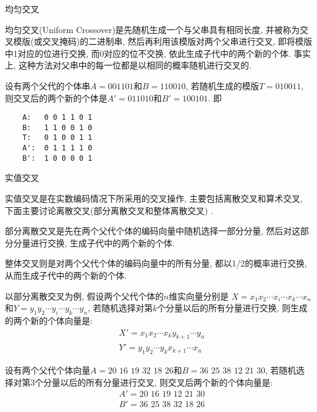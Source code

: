 { 均匀交叉

均匀交叉(Uniform Crossover)是先随机生成一个与父串具有相同长度, 并被称为交叉模版(或交叉掩码)的二进制串, 然后再利用该模版对两个父串进行交叉, 即将模版中1对应的位进行交换, 而0对应的位不交换, 依此生成子代中的两个新的个体.
事实上, 这种方法对父串中的每一位都是以相同的概率随机进行交叉的.

\begin{example}
设有两个父代的个体串$A=001101$和$B=110010$, 若随机生成的模版$T=010011$, 则交叉后的两个新的个体是$A'=011010$和$B'=100101$. 即
\begin{center}
\begin{Verbatim}
    A:   0 0 1 1 0 1
    B:   1 1 0 0 1 0
    T:   0 1 0 0 1 1
    A':  0 1 1 1 1 0
    B':  1 0 0 0 0 1
\end{Verbatim}
\end{center}

     实值交叉
\end{example}

实值交叉是在实数编码情况下所采用的交叉操作, 主要包括离散交叉和算术交叉, 下面主要讨论离散交叉(部分离散交叉和整体离散交叉) .

部分离散交叉是先在两个父代个体的编码向量中随机选择一部分分量, 然后对这部分分量进行交换, 生成子代中的两个新的个体.

整体交叉则是对两个父代个体的编码向量中的所有分量, 都以1/2的概率进行交换, 从而生成子代中的两个新的个体.

以部分离散交叉为例, 假设两个父代个体的$n$维实向量分别是 $X=x_1x_2\cdots x_i\cdots x_k\cdots x_n$和$Y=y_1 y_2\cdots y_i \cdots y_k \cdots y_n$, 若随机选择对第$k$个分量以后的所有分量进行交换, 则生成的两个新的个体向量是:
\begin{align}
  &X'= x_1 x_2 \cdots x_k y_{k+1} \cdots y_n\\
  &Y'= y_1 y_2 \cdots y_k x_{k+1} \cdots x_n
\end{align}

\begin{example}
设有两个父代个体向量$A=20\,\,  16\,\,  19\,\,  32 \,\, 18 \,\, 26$和$B=36\,\,  25\,\,  38\,\,  12\,\,  21\,\,  30$, 若随机选择对第3个分量以后的所有分量进行交叉, 则交叉后两个新的个体向量是:
\begin{align}
  &A'= 20\,\, 16\,\,  19\,\,  12\,\,  21\,\,  30\\
  &B'= 36\,\,  25\,\,  38\,\,  32\,\,  18\,\,  26
\end{align}


\end{example}}
